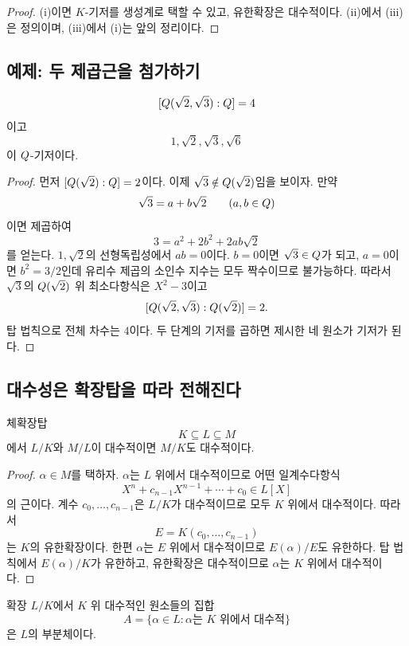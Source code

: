 \begin{proof}
(i)이면 $K$-기저를 생성계로 택할 수 있고, 유한확장은 대수적이다. (ii)에서 (iii)은 정의이며, (iii)에서 (i)는 앞의 정리이다.
\end{proof}

\subsection{예제: 두 제곱근을 첨가하기}

\begin{proposition}
\[
  [Q(\sqrt2,\sqrt3):Q]=4
\]
이고
\[
  1,\sqrt2,\sqrt3,\sqrt6
\]
이 $Q$-기저이다.
\end{proposition}

\begin{proof}
먼저 $[Q(\sqrt2):Q]=2$이다. 이제 $\sqrt3\notin Q(\sqrt2)$임을 보이자. 만약
\[
  \sqrt3=a+b\sqrt2
  \qquad(a,b\in Q)
\]
이면 제곱하여
\[
  3=a^2+2b^2+2ab\sqrt2
\]
를 얻는다. $1,\sqrt2$의 선형독립성에서 $ab=0$이다. $b=0$이면 $\sqrt3\in Q$가 되고, $a=0$이면 $b^2=3/2$인데 유리수 제곱의 소인수 지수는 모두 짝수이므로 불가능하다. 따라서 $\sqrt3$의 $Q(\sqrt2)$ 위 최소다항식은 $X^2-3$이고
\[
  [Q(\sqrt2,\sqrt3):Q(\sqrt2)]=2.
\]
탑 법칙으로 전체 차수는 $4$이다. 두 단계의 기저를 곱하면 제시한 네 원소가 기저가 된다.
\end{proof}

\subsection{대수성은 확장탑을 따라 전해진다}

\begin{theorem}
체확장탑
\[
  K\subseteq L\subseteq M
\]
에서 $L/K$와 $M/L$이 대수적이면 $M/K$도 대수적이다.
\end{theorem}

\begin{proof}
$\alpha\in M$를 택하자. $\alpha$는 $L$ 위에서 대수적이므로 어떤 일계수다항식
\[
  X^n+c_{n-1}X^{n-1}+\cdots+c_0\in L[X]
\]
의 근이다. 계수 $c_0,\dots,c_{n-1}$은 $L/K$가 대수적이므로 모두 $K$ 위에서 대수적이다. 따라서
\[
  E=K(c_0,\dots,c_{n-1})
\]
는 $K$의 유한확장이다. 한편 $\alpha$는 $E$ 위에서 대수적이므로 $E(\alpha)/E$도 유한하다. 탑 법칙에서 $E(\alpha)/K$가 유한하고, 유한확장은 대수적이므로 $\alpha$는 $K$ 위에서 대수적이다.
\end{proof}

\begin{corollary}
확장 $L/K$에서 $K$ 위 대수적인 원소들의 집합
\[
  A=\{\alpha\in L:\alpha\text{는 }K\text{ 위에서 대수적}\}
\]
은 $L$의 부분체이다.
\end{corollary}

